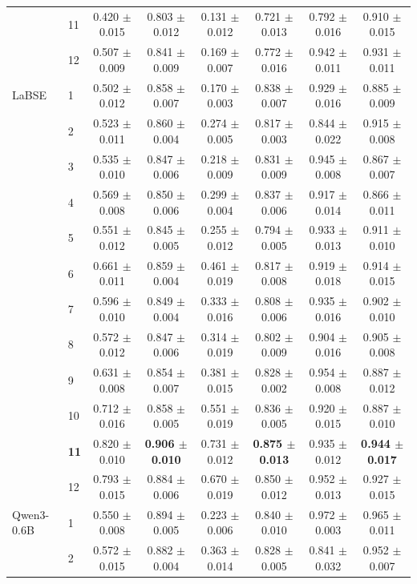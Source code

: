 \begin{longtable}{llcccccc}
 & 11 & 0.420 $\pm$ 0.015 & 0.803 $\pm$ 0.012 & 0.131 $\pm$ 0.012 & 0.721 $\pm$ 0.013 & 0.792 $\pm$ 0.016 & 0.910 $\pm$ 0.015 \\
 & 12 & 0.507 $\pm$ 0.009 & 0.841 $\pm$ 0.009 & 0.169 $\pm$ 0.007 & 0.772 $\pm$ 0.016 & 0.942 $\pm$ 0.011 & 0.931 $\pm$ 0.011 \\
\midrule
LaBSE & 1 & 0.502 $\pm$ 0.012 & 0.858 $\pm$ 0.007 & 0.170 $\pm$ 0.003 & 0.838 $\pm$ 0.007 & 0.929 $\pm$ 0.016 & 0.885 $\pm$ 0.009 \\
 & 2 & 0.523 $\pm$ 0.011 & 0.860 $\pm$ 0.004 & 0.274 $\pm$ 0.005 & 0.817 $\pm$ 0.003 & 0.844 $\pm$ 0.022 & 0.915 $\pm$ 0.008 \\
 & 3 & 0.535 $\pm$ 0.010 & 0.847 $\pm$ 0.006 & 0.218 $\pm$ 0.009 & 0.831 $\pm$ 0.009 & 0.945 $\pm$ 0.008 & 0.867 $\pm$ 0.007 \\
 & 4 & 0.569 $\pm$ 0.008 & 0.850 $\pm$ 0.006 & 0.299 $\pm$ 0.004 & 0.837 $\pm$ 0.006 & 0.917 $\pm$ 0.014 & 0.866 $\pm$ 0.011 \\
 & 5 & 0.551 $\pm$ 0.012 & 0.845 $\pm$ 0.005 & 0.255 $\pm$ 0.012 & 0.794 $\pm$ 0.005 & 0.933 $\pm$ 0.013 & 0.911 $\pm$ 0.010 \\
 & 6 & 0.661 $\pm$ 0.011 & 0.859 $\pm$ 0.004 & 0.461 $\pm$ 0.019 & 0.817 $\pm$ 0.008 & 0.919 $\pm$ 0.018 & 0.914 $\pm$ 0.015 \\
 & 7 & 0.596 $\pm$ 0.010 & 0.849 $\pm$ 0.004 & 0.333 $\pm$ 0.016 & 0.808 $\pm$ 0.006 & 0.935 $\pm$ 0.016 & 0.902 $\pm$ 0.010 \\
 & 8 & 0.572 $\pm$ 0.012 & 0.847 $\pm$ 0.006 & 0.314 $\pm$ 0.019 & 0.802 $\pm$ 0.009 & 0.904 $\pm$ 0.016 & 0.905 $\pm$ 0.008 \\
 & 9 & 0.631 $\pm$ 0.008 & 0.854 $\pm$ 0.007 & 0.381 $\pm$ 0.015 & 0.828 $\pm$ 0.002 & 0.954 $\pm$ 0.008 & 0.887 $\pm$ 0.012 \\
 & 10 & 0.712 $\pm$ 0.016 & 0.858 $\pm$ 0.005 & 0.551 $\pm$ 0.019 & 0.836 $\pm$ 0.005 & 0.920 $\pm$ 0.015 & 0.887 $\pm$ 0.010 \\
 & \textbf{11} & 0.820 $\pm$ 0.010 & \textbf{0.906 $\pm$ 0.010} & 0.731 $\pm$ 0.012 & \textbf{0.875 $\pm$ 0.013} & 0.935 $\pm$ 0.012 & \textbf{0.944 $\pm$ 0.017} \\
 & 12 & 0.793 $\pm$ 0.015 & 0.884 $\pm$ 0.006 & 0.670 $\pm$ 0.019 & 0.850 $\pm$ 0.012 & 0.952 $\pm$ 0.013 & 0.927 $\pm$ 0.015 \\
\midrule
Qwen3-0.6B & 1 & 0.550 $\pm$ 0.008 & 0.894 $\pm$ 0.005 & 0.223 $\pm$ 0.006 & 0.840 $\pm$ 0.010 & 0.972 $\pm$ 0.003 & 0.965 $\pm$ 0.011 \\
 & 2 & 0.572 $\pm$ 0.015 & 0.882 $\pm$ 0.004 & 0.363 $\pm$ 0.014 & 0.828 $\pm$ 0.005 & 0.841 $\pm$ 0.032 & 0.952 $\pm$ 0.007 \\

\end{longtable}
